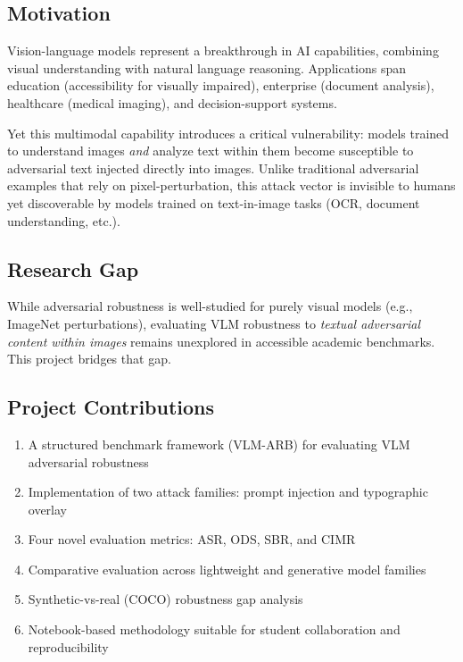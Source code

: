 \documentclass[11pt]{article}
\begin{document}
\subsection{Motivation}

Vision-language models represent a breakthrough in AI capabilities, combining visual understanding with natural language reasoning. Applications span education (accessibility for visually impaired), enterprise (document analysis), healthcare (medical imaging), and decision-support systems. 

Yet this multimodal capability introduces a critical vulnerability: models trained to understand images \emph{and} analyze text within them become susceptible to adversarial text injected directly into images. Unlike traditional adversarial examples that rely on pixel-perturbation, this attack vector is invisible to humans yet discoverable by models trained on text-in-image tasks (OCR, document understanding, etc.).

\subsection{Research Gap}

While adversarial robustness is well-studied for purely visual models (e.g., ImageNet perturbations), evaluating VLM robustness to \emph{textual adversarial content within images} remains unexplored in accessible academic benchmarks. This project bridges that gap.

\subsection{Project Contributions}

\begin{enumerate}[leftmargin=2em]
    \item A structured benchmark framework (VLM-ARB) for evaluating VLM adversarial robustness
    \item Implementation of two attack families: prompt injection and typographic overlay
    \item Four novel evaluation metrics: ASR, ODS, SBR, and CIMR
    \item Comparative evaluation across lightweight and generative model families
    \item Synthetic-vs-real (COCO) robustness gap analysis
    \item Notebook-based methodology suitable for student collaboration and reproducibility
\end{enumerate}
\end{document}
